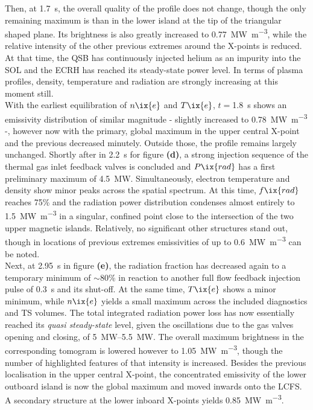            Then, at \SI{1.7}{\second}, the overall quality of the profile does not change, though the only remaining maximum is than in the lower island at the tip of the triangular shaped plane. Its brightness is also greatly increased to \SI{0.77}{\mega\watt\per\cubic\meter}, while the relative intensity of the other previous extremes around the X-points is reduced. At that time, the QSB has continuously injected helium as an impurity into the SOL and the ECRH has reached its steady-state power level. In terms of plasma profiles, density, temperature and radiation are strongly increasing at this moment still.\\%
            With the earliest equilibration of $n\ix{e}$ and $T\ix{e}$, $t=$\SI{1.8}{\second} shows an emissivity distribution of similar magnitude - slightly increased to \SI{0.78}{\mega\watt\per\cubic\meter} -, however now with the primary, global maximum in the upper central X-point and the previous decreased minutely. Outside those, the profile remains largely unchanged. Shortly after in \SI{2.2}{\second} for figure \textbf{(d)}, a strong injection sequence of the thermal gas inlet feedback valves is concluded and $P\ix{rad}$ has a first preliminary maximum of \SI{4.5}{\mega\watt}. Simultaneously, electron temperature and density show minor peaks across the spatial spectrum. At this time, $f\ix{rad}$ reaches 75\% and the radiation power distribution condenses almost entirely to \SI{1.5}{\mega\watt\per\cubic\meter} in a singular, confined point close to the intersection of the two upper magnetic islands. Relatively, no significant other structures stand out, though in locations of previous extremes emissivities of up to \SI{0.6}{\mega\watt\per\cubic\meter} can be noted.\\%
            Next, at \SI{2.95}{\second} in figure \textbf{(e)}, the radiation fraction has decreased again to a temporary minimum of $\sim80\%$ in reaction to another full flow feedback injection pulse of \SI{0.3}{\second} and its shut-off. At the same time, $T\ix{e}$ shows a minor minimum, while $n\ix{e}$ yields a small maximum across the included diagnostics and TS volumes. The total integrated radiation power loss has now essentially reached its \textit{quasi steady-state} level, given the oscillations due to the gas valves opening and closing, of \SIrange{5}{5.5}{\mega\watt}. The overall maximum brightness in the corresponding tomogram is lowered however to \SI{1.05}{\mega\watt\per\cubic\meter}, though the number of highlighted features of that intensity is increased. Besides the previous localisation in the upper central X-point, the concentrated emissivity of the lower outboard island is now the global maximum and moved inwards onto the LCFS. A secondary structure at the lower inboard X-points yields \SI{0.85}{\mega\watt\per\cubic\meter}.\\%
